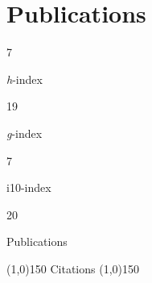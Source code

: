 \documentclass[11pt,a4paper,]{awesome-cv}
\begin{document}
\section{Publications}\label{publications}

\begin{tcolorbox}[enhanced,
        on line, 
        boxsep=4pt, left=0pt,right=0pt,top=0pt,bottom=0pt,
        colframe=white,colback=violet,
        hyperurl={https://scholar.google.com/citations?user=XgNEpfgAAAAJ}]
  
\color{white}
  \begin{minipage}[c]{0.245\linewidth}
    \begin{center} 
      \begin{huge} 7 \end{huge}
     \begin{small} \textit{h}-index \end{small} 
    \end{center} 
  \end{minipage} 
  \begin{minipage}[c]{0.245\linewidth}
    \begin{center} 
      \begin{huge} 19 \end{huge}
      \begin{small} \textit{g}-index \end{small} 
    \end{center}
  \end{minipage} 
  \begin{minipage}[c]{0.245\linewidth}
    \begin{center} 
      \begin{huge} 7 \end{huge}
      \begin{small} i10-index \end{small} 
    \end{center}
  \end{minipage} 
  \begin{minipage}[c]{0.245\linewidth}
    \begin{center}  
      \begin{huge} 20 \end{huge}
      \begin{small} Publications \end{small} 
    \end{center}
  \end{minipage} 
  
  \begin{center} \noindent\line(1,0){150} Citations \noindent\line(1,0){150} \end{center}
  

\end{tcolorbox}
\end{document}
